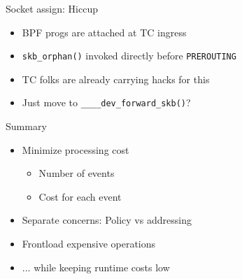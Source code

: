 \documentclass[black,white]{beamer}
\DeclareRobustCommand{\#}{\adjustbox{valign=B,totalheight=.57\baselineskip}{\oldhash}}%
\begin{document}
    \begin{frame}[fragile]{Socket assign: Hiccup}
        \centering
        \begin{itemize}
            \item BPF progs are attached at TC ingress \medskip
            \item \verb+skb_orphan()+ invoked directly before \verb+PREROUTING+ \medskip
            \pause
            \item TC folks are already carrying hacks for this\footnotemark \medskip
            \pause
            \item Just move to \verb+____dev_forward_skb()+\footnotemark? \medskip
        \end{itemize}
    \end{frame}

    \begin{frame}{Summary}
        \begin{itemize}
            \item Minimize processing cost \smallskip
            \begin{itemize}
                \item Number of events \medskip
                \item Cost for each event \medskip
            \end{itemize}
            \item Separate concerns: Policy vs addressing \medskip
            \item Frontload expensive operations \medskip
            \item ... while keeping runtime costs low \medskip
        \end{itemize}
    \end{frame}
\end{document}
